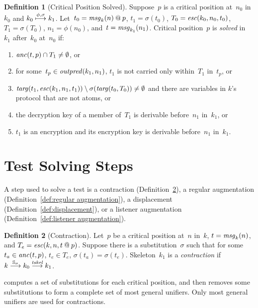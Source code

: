 \documentclass[12pt]{report}
\theoremstyle{definition}
\newtheorem{defn}{Definition}[chapter]
\newcommand{\outpred}{\fn{outpred}}
\newcommand{\msg}{\fn{msg}}
\begin{document}
\begin{defn}[Critical Position Solved]\label{def:critical position solved}
Suppose~$p$ is a critical position at~$n_0$ in~$k_0$ and
$k_0\stackrel{\phi,\sigma}{\longmapsto}k_1$.  Let~$t_0=\msg_k(n)\termat p$,
$t_1=\sigma(t_0)$, $T_0=\operatorname{\mathit{esc}}(k_0,n_0,t_0)$, $T_1=\sigma(T_0)$,
$n_1=\phi(n_0)$, and~$t=\msg_{k_1}(n_1)$.  Critical position~$p$ is
\emph{solved} in~$k_1$ after~$k_0$
at~$n_0$ if:
\begin{enumerate}
\item $\operatorname{\mathit{anc}}(t,p)\cap T_1\neq\emptyset$, or
\item for some~$t_p\in\outpred(k_1,n_1)$, $t_1$ is not carried
  only within~$T_1$ in~$t_p$, or
\item
  $\operatorname{\mathit{targ}}(t_1,\operatorname{\mathit{esc}}(k_1,n_1,t_1))\setminus\sigma(\operatorname{\mathit{targ}}(t_0,T_0))\neq\emptyset$
  and there are variables in $k$'s protocol that are not atoms, or
\item the decryption key of a member of~$T_1$ is derivable
  before~$n_1$ in~$k_1$, or
\item $t_1$ is an encryption and its encryption key is derivable
  before~$n_1$ in~$k_1$.
\end{enumerate}
\end{defn}

\section{Test Solving Steps}

A step used to solve a test is a contraction
(Definition~\ref{def:contraction}), a regular augmentation
(Definition~\ref{def:regular augmentation}), a displacement
(Definition~\ref{def:displacement}), or a listener augmentation
(Definition~\ref{def:listener augmentation}).

\begin{defn}[Contraction]\label{def:contraction}
Let~$p$ be a critical position
at~$n$ in~$k$, $t=\msg_k(n)$, and $T_e= \operatorname{\mathit{esc}}(k,n,t\mathbin{@} p)$.
Suppose there is a substitution~$\sigma$ such that for
some~$t_a\in\operatorname{\mathit{anc}}(t,p)$, $t_e\in T_e$, $\sigma(t_a)=\sigma(t_e)$.
Skeleton~$k_1$ is a \emph{contraction} if
$k\stackrel{\mathbb S_\sigma}{\longrightarrow}k_0\stackrel{\operatorname{\mathit{tskel}}}{\longrightarrow}k_1$.
\end{defn}

{\cpsa} computes a set of substitutions for each critical position, and
then removes some substitutions to form a complete set of most
general unifiers.  Only most general unifiers are used for
contractions.
\end{document}
